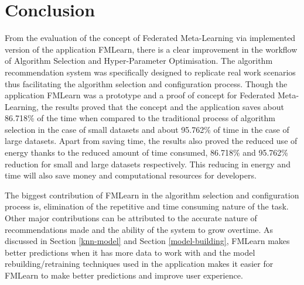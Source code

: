 \chapter{Conclusion}

From the evaluation of the concept of Federated Meta-Learning via implemented version of the application FMLearn, there is a clear improvement in the workflow of Algorithm Selection and Hyper-Parameter Optimisation. The algorithm recommendation system was specifically designed to replicate real work scenarios thus facilitating the algorithm selection and configuration process. Though the application FMLearn was a prototype and a proof of concept for Federated Meta-Learning, the results proved that the concept and the application saves about 86.718\% of the time when compared to the traditional process of algorithm selection in the case of small datasets and about 95.762\% of time in the case of large datasets. Apart from saving time, the results also proved the reduced use of energy thanks to the reduced amount of time consumed, 86.718\% and 95.762\% reduction for small and large datasets respectively. This reducing in energy and time will also save money and computational resources for developers.

The biggest contribution of FMLearn in the algorithm selection and configuration process is, elimination of the repetitive and time consuming nature of the task. Other major contributions can be attributed to the accurate nature of recommendations made and the ability of the system to grow overtime. As discussed in Section \ref{knn-model} and Section \ref{model-building}, FMLearn makes better predictions when it has more data to work with and the model rebuilding/retraining techniques used in the application makes it easier for FMLearn to make better predictions and improve user experience. 